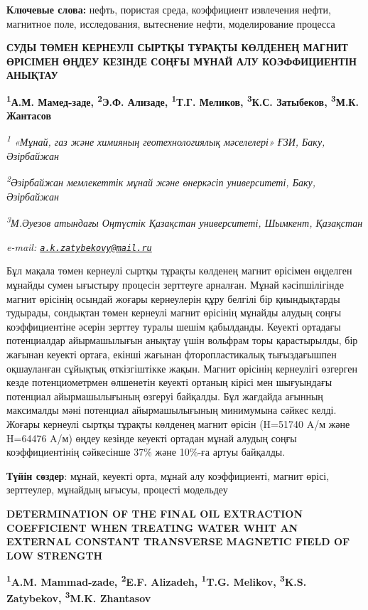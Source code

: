 {\bfseries Ключевые слова:} нефть, пористая среда, коэффициент извлечения
нефти, магнитное поле, исследования, вытеснение нефти, моделирование
процесса

\begin{articleheader}
{\bfseries СУДЫ ТӨМЕН КЕРНЕУЛІ СЫРТҚЫ ТҰРАҚТЫ КӨЛДЕНЕҢ МАГНИТ ӨРІСІМЕН ӨҢДЕУ КЕЗІНДЕ СОҢҒЫ МҰНАЙ АЛУ КОЭФФИЦИЕНТІН АНЫҚТАУ}

{\bfseries
\textsuperscript{1}А.М. Мамед-заде,
\textsuperscript{2}Э.Ф. Ализаде,
\textsuperscript{1}Т.Г. Меликов,
\textsuperscript{3}К.С. Затыбеков\textsuperscript{\envelope },
\textsuperscript{3}М.К. Жантасов}
\end{articleheader}

\begin{affiliation}
\emph{\textsuperscript{1} «Мұнай, газ және химияның геотехнологиялық мәселелері» ҒЗИ, Баку, Әзірбайжан}

\emph{\textsuperscript{2}Әзірбайжан мемлекеттік мұнай және өнеркәсіп университеті, Баку, Әзірбайжан}

\emph{\textsuperscript{3}М.Әуезов атындағы Оңтүстік Қазақстан университеті, Шымкент, Қазақстан}

\emph{e-mail: \href{mailto:a.k.zatybekovy@mail.ru}{\nolinkurl{a.k.zatybekovy@mail.ru}}}
\end{affiliation}

Бұл мақала төмен кернеулі сыртқы тұрақты көлденең магнит өрісімен
өңделген мұнайды сумен ығыстыру процесін зерттеуге арналған. Мұнай
кәсіпшілігінде магнит өрісінің осындай жоғары кернеулерін құру белгілі
бір қиындықтарды тудырады, сондықтан төмен кернеулі магнит өрісінің
мұнайды алудың соңғы коэффициентіне әсерін зерттеу туралы шешім
қабылданды. Кеуекті ортадағы потенциалдар айырмашылығын анықтау үшін
вольфрам торы қарастырылды, бір жағынан кеуекті ортаға, екінші жағынан
фторопластикалық тығыздағышпен оқшауланған сұйықтық өткізгіштікке жақын.
Магнит өрісінің кернеулігі өзгерген кезде потенциометрмен өлшенетін
кеуекті ортаның кірісі мен шығуындағы потенциал айырмашылығының өзгеруі
байқалды. Бұл жағдайда ағынның максималды мәні потенциал айырмашылығының
минимумына сәйкес келді. Жоғары кернеулі сыртқы тұрақты көлденең магнит
өрісін (H=51740 A/м және H=64476 A/м) өңдеу кезінде кеуекті ортадан
мұнай алудың соңғы коэффициентінің сәйкесінше 37\% және 10\%-ға артуы
байқалды.

{\bfseries Түйін сөздер}: мұнай, кеуекті орта, мұнай алу коэффициенті,
магнит өрісі, зерттеулер, мұнайдың ығысуы, процесті модельдеу

\begin{articleheader}
{\bfseries DETERMINATION OF THE FINAL OIL EXTRACTION COEFFICIENT WHEN TREATING WATER WHIT AN EXTERNAL CONSTANT TRANSVERSE MAGNETIC FIELD OF LOW STRENGTH}

{\bfseries
\textsuperscript{1}A.M. Mammad-zade,
\textsuperscript{2}E.F. Alizadeh,
\textsuperscript{1}T.G. Melikov,
\textsuperscript{3}K.S. Zatybekov\textsuperscript{\envelope },
\textsuperscript{3}M.K. Zhantasov}
\end{articleheader}


